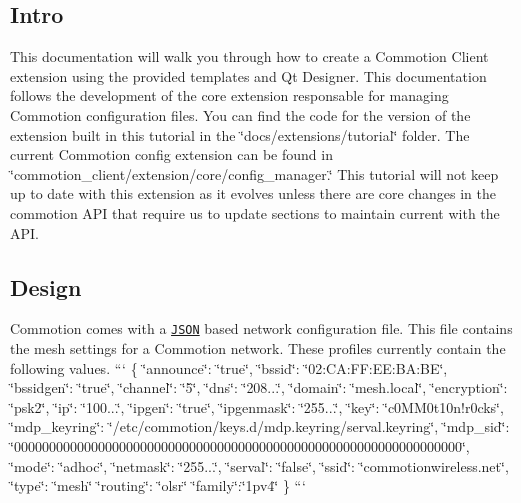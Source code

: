 \subsection*{Intro}

This documentation will walk you through how to create a Commotion Client extension using the provided templates and Qt Designer. This documentation follows the development of the core extension responsable for managing Commotion configuration files. You can find the code for the version of the extension built in this tutorial in the \char`\"{}docs/extensions/tutorial\char`\"{} folder. The current Commotion config extension can be found in \char`\"{}commotion\-\_\-client/extension/core/config\-\_\-manager.\char`\"{} This tutorial will not keep up to date with this extension as it evolves unless there are core changes in the commotion A\-P\-I that require us to update sections to maintain current with the A\-P\-I.

\subsection*{Design}

Commotion comes with a \href{http://json.org/}{\tt J\-S\-O\-N} based network configuration file. This file contains the mesh settings for a Commotion network. These profiles currently contain the following values. ``` \{ \char`\"{}announce\char`\"{}\-: \char`\"{}true\char`\"{}, \char`\"{}bssid\char`\"{}\-: \char`\"{}02\-:\-C\-A\-:\-F\-F\-:\-E\-E\-:\-B\-A\-:\-B\-E\char`\"{}, \char`\"{}bssidgen\char`\"{}\-: \char`\"{}true\char`\"{}, \char`\"{}channel\char`\"{}\-: \char`\"{}5\char`\"{}, \char`\"{}dns\char`\"{}\-: \char`\"{}208...\char`\"{}, \char`\"{}domain\char`\"{}\-: \char`\"{}mesh.\-local\char`\"{}, \char`\"{}encryption\char`\"{}\-: \char`\"{}psk2\char`\"{}, \char`\"{}ip\char`\"{}\-: \char`\"{}100...\char`\"{}, \char`\"{}ipgen\char`\"{}\-: \char`\"{}true\char`\"{}, \char`\"{}ipgenmask\char`\"{}\-: \char`\"{}255...\char`\"{}, \char`\"{}key\char`\"{}\-: \char`\"{}c0\-M\-M0t10n!r0cks\char`\"{}, \char`\"{}mdp\-\_\-keyring\char`\"{}\-: \char`\"{}/etc/commotion/keys.\-d/mdp.\-keyring/serval.\-keyring\char`\"{}, \char`\"{}mdp\-\_\-sid\char`\"{}\-: \char`\"{}0000000000000000000000000000000000000000000000000000000000000000\char`\"{}, \char`\"{}mode\char`\"{}\-: \char`\"{}adhoc\char`\"{}, \char`\"{}netmask\char`\"{}\-: \char`\"{}255...\char`\"{}, \char`\"{}serval\char`\"{}\-: \char`\"{}false\char`\"{}, \char`\"{}ssid\char`\"{}\-: \char`\"{}commotionwireless.\-net\char`\"{}, \char`\"{}type\char`\"{}\-: \char`\"{}mesh\char`\"{} \char`\"{}routing\char`\"{}\-: \char`\"{}olsr\char`\"{} \char`\"{}family\char`\"{}\-:\char`\"{}1pv4\char`\"{} \} ```

